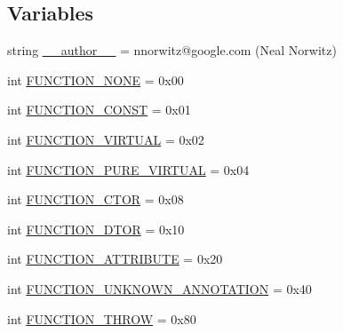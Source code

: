 \subsection*{Variables}
\begin{DoxyCompactItemize}
\item 
string \mbox{\hyperlink{namespacegoogletest-master_1_1googlemock_1_1scripts_1_1generator_1_1cpp_1_1ast_a532b223f9c9c7c893c7764ad72e3327f}{\+\_\+\+\_\+author\+\_\+\+\_\+}} = \textquotesingle{}nnorwitz@google.\+com (Neal Norwitz)\textquotesingle{}
\item 
int \mbox{\hyperlink{namespacegoogletest-master_1_1googlemock_1_1scripts_1_1generator_1_1cpp_1_1ast_a453fc301daaf953122e2e144ac355f13}{F\+U\+N\+C\+T\+I\+O\+N\+\_\+\+N\+O\+NE}} = 0x00
\item 
int \mbox{\hyperlink{namespacegoogletest-master_1_1googlemock_1_1scripts_1_1generator_1_1cpp_1_1ast_aa0aef84d5d5ae539701fafcae6ef658a}{F\+U\+N\+C\+T\+I\+O\+N\+\_\+\+C\+O\+N\+ST}} = 0x01
\item 
int \mbox{\hyperlink{namespacegoogletest-master_1_1googlemock_1_1scripts_1_1generator_1_1cpp_1_1ast_ab5c044e6c3241e262ecb6881ae32fccd}{F\+U\+N\+C\+T\+I\+O\+N\+\_\+\+V\+I\+R\+T\+U\+AL}} = 0x02
\item 
int \mbox{\hyperlink{namespacegoogletest-master_1_1googlemock_1_1scripts_1_1generator_1_1cpp_1_1ast_a0269029d542580eb3754e403705aaaea}{F\+U\+N\+C\+T\+I\+O\+N\+\_\+\+P\+U\+R\+E\+\_\+\+V\+I\+R\+T\+U\+AL}} = 0x04
\item 
int \mbox{\hyperlink{namespacegoogletest-master_1_1googlemock_1_1scripts_1_1generator_1_1cpp_1_1ast_aedd420932bd6d3f39869ba70aabfdf74}{F\+U\+N\+C\+T\+I\+O\+N\+\_\+\+C\+T\+OR}} = 0x08
\item 
int \mbox{\hyperlink{namespacegoogletest-master_1_1googlemock_1_1scripts_1_1generator_1_1cpp_1_1ast_aed8775ec393bbaaecf30b84853f61f56}{F\+U\+N\+C\+T\+I\+O\+N\+\_\+\+D\+T\+OR}} = 0x10
\item 
int \mbox{\hyperlink{namespacegoogletest-master_1_1googlemock_1_1scripts_1_1generator_1_1cpp_1_1ast_aafd16d2b1ef8cd2f49938b6cc7be9f06}{F\+U\+N\+C\+T\+I\+O\+N\+\_\+\+A\+T\+T\+R\+I\+B\+U\+TE}} = 0x20
\item 
int \mbox{\hyperlink{namespacegoogletest-master_1_1googlemock_1_1scripts_1_1generator_1_1cpp_1_1ast_a25e74e72724f3c7efddb6b23892fd223}{F\+U\+N\+C\+T\+I\+O\+N\+\_\+\+U\+N\+K\+N\+O\+W\+N\+\_\+\+A\+N\+N\+O\+T\+A\+T\+I\+ON}} = 0x40
\item 
int \mbox{\hyperlink{namespacegoogletest-master_1_1googlemock_1_1scripts_1_1generator_1_1cpp_1_1ast_a104c6319c44299d684ee60c8d6879fde}{F\+U\+N\+C\+T\+I\+O\+N\+\_\+\+T\+H\+R\+OW}} = 0x80

\end{DoxyCompactItemize}
